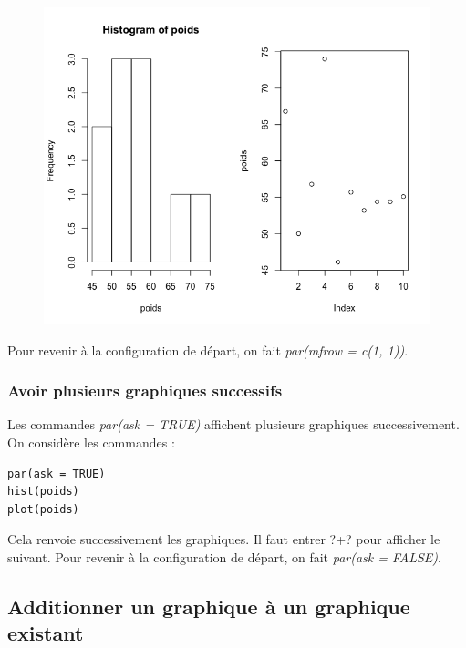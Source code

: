 \begin{figure}[H]\begin{center}\includegraphics[scale=0.4]{ilu/gra53.png}\end{center}\end{figure}
Pour revenir à la configuration de départ, on fait \textit{par(mfrow = c(1, 1))}.

\subsubsection{Avoir plusieurs graphiques successifs}
Les commandes \textit{par(ask = TRUE)} affichent plusieurs graphiques successivement.
On considère les commandes :
\begin{lstlisting}[language=html]
par(ask = TRUE)
hist(poids)
plot(poids)
\end{lstlisting}
Cela renvoie successivement les graphiques. Il faut entrer ?+? pour afficher le suivant.\newline
Pour revenir à la configuration de départ, on fait \textit{par(ask = FALSE)}.
\subsection{Additionner un graphique à un graphique existant}
